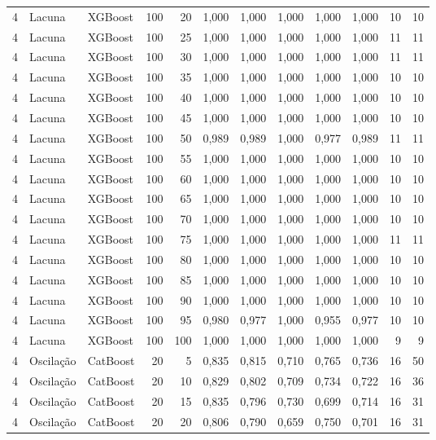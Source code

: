 \begin{longtable}{@{}rllrrrrrrrrr@{}}
4 & Lacuna & XGBoost & 100 & 20 & 1,000 & 1,000 & 1,000 & 1,000 & 1,000 & 10 & 10 \\
4 & Lacuna & XGBoost & 100 & 25 & 1,000 & 1,000 & 1,000 & 1,000 & 1,000 & 11 & 11 \\
4 & Lacuna & XGBoost & 100 & 30 & 1,000 & 1,000 & 1,000 & 1,000 & 1,000 & 11 & 11 \\
4 & Lacuna & XGBoost & 100 & 35 & 1,000 & 1,000 & 1,000 & 1,000 & 1,000 & 10 & 10 \\
4 & Lacuna & XGBoost & 100 & 40 & 1,000 & 1,000 & 1,000 & 1,000 & 1,000 & 10 & 10 \\
4 & Lacuna & XGBoost & 100 & 45 & 1,000 & 1,000 & 1,000 & 1,000 & 1,000 & 10 & 10 \\
4 & Lacuna & XGBoost & 100 & 50 & 0,989 & 0,989 & 1,000 & 0,977 & 0,989 & 11 & 11 \\
4 & Lacuna & XGBoost & 100 & 55 & 1,000 & 1,000 & 1,000 & 1,000 & 1,000 & 10 & 10 \\
4 & Lacuna & XGBoost & 100 & 60 & 1,000 & 1,000 & 1,000 & 1,000 & 1,000 & 10 & 10 \\
4 & Lacuna & XGBoost & 100 & 65 & 1,000 & 1,000 & 1,000 & 1,000 & 1,000 & 10 & 10 \\
4 & Lacuna & XGBoost & 100 & 70 & 1,000 & 1,000 & 1,000 & 1,000 & 1,000 & 10 & 10 \\
4 & Lacuna & XGBoost & 100 & 75 & 1,000 & 1,000 & 1,000 & 1,000 & 1,000 & 11 & 11 \\
4 & Lacuna & XGBoost & 100 & 80 & 1,000 & 1,000 & 1,000 & 1,000 & 1,000 & 10 & 10 \\
4 & Lacuna & XGBoost & 100 & 85 & 1,000 & 1,000 & 1,000 & 1,000 & 1,000 & 10 & 10 \\
4 & Lacuna & XGBoost & 100 & 90 & 1,000 & 1,000 & 1,000 & 1,000 & 1,000 & 10 & 10 \\
4 & Lacuna & XGBoost & 100 & 95 & 0,980 & 0,977 & 1,000 & 0,955 & 0,977 & 10 & 10 \\
4 & Lacuna & XGBoost & 100 & 100 & 1,000 & 1,000 & 1,000 & 1,000 & 1,000 & 9 & 9 \\
4 & Oscilação & CatBoost & 20 & 5 & 0,835 & 0,815 & 0,710 & 0,765 & 0,736 & 16 & 50 \\
4 & Oscilação & CatBoost & 20 & 10 & 0,829 & 0,802 & 0,709 & 0,734 & 0,722 & 16 & 36 \\
4 & Oscilação & CatBoost & 20 & 15 & 0,835 & 0,796 & 0,730 & 0,699 & 0,714 & 16 & 31 \\
4 & Oscilação & CatBoost & 20 & 20 & 0,806 & 0,790 & 0,659 & 0,750 & 0,701 & 16 & 31 \\

\end{longtable}
